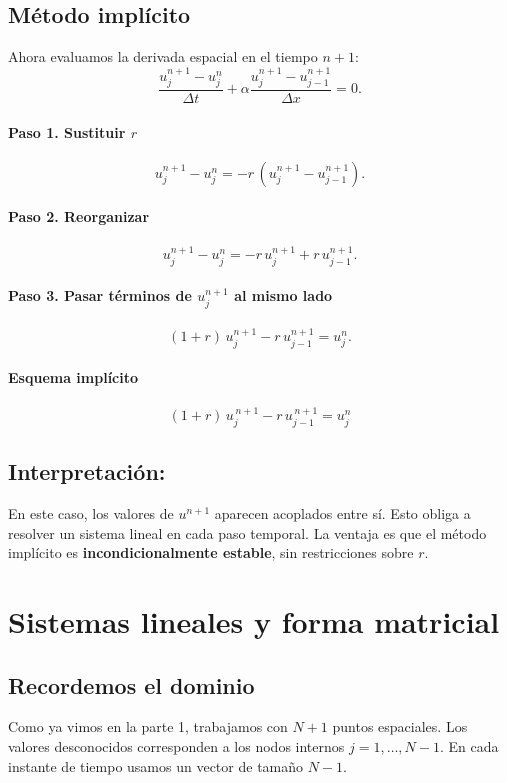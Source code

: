 \documentclass[12pt,a4paper]{article}
\begin{document}
\subsection{Método implícito}

Ahora evaluamos la derivada espacial en el tiempo $n+1$:
\[
\frac{u_j^{n+1}-u_j^n}{\Delta t} + \alpha \frac{u_j^{n+1} - u_{j-1}^{n+1}}{\Delta x} = 0.
\]

\paragraph{Paso 1. Sustituir $r$}  
\[
u_j^{n+1} - u_j^n = -r\,(u_j^{n+1} - u_{j-1}^{n+1}).
\]

\paragraph{Paso 2. Reorganizar}  
\[
u_j^{n+1} - u_j^n = -r\,u_j^{n+1} + r\,u_{j-1}^{n+1}.
\]

\paragraph{Paso 3. Pasar términos de $u_j^{n+1}$ al mismo lado}  
\[
(1+r)\,u_j^{n+1} - r\,u_{j-1}^{n+1} = u_j^n.
\]

\paragraph{Esquema implícito}  
\[
\boxed{(1+r)\,u_j^{\,n+1} - r\,u_{j-1}^{\,n+1} = u_j^n}
\]

\subsection*{Interpretación:}
En este caso, los valores de $u^{n+1}$ aparecen acoplados entre sí.  
Esto obliga a resolver un sistema lineal en cada paso temporal.  
La ventaja es que el método implícito es \textbf{incondicionalmente estable}, sin restricciones sobre $r$.

\section{Sistemas lineales y forma matricial}

\subsection{Recordemos el dominio}
Como ya vimos en la parte 1, trabajamos con $N+1$ puntos espaciales.  
Los valores desconocidos corresponden a los nodos internos $j=1,\dots,N-1$. En cada instante de tiempo usamos un vector de tamaño $N-1$.
\end{document}
